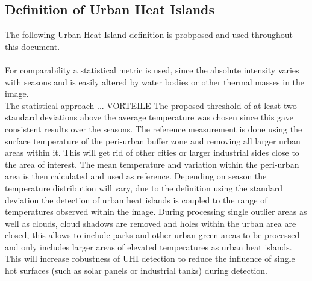 \documentclass[12pt,a4paper, english,twoside]{article}
\begin{document}
    \subsection{Definition of Urban Heat Islands}\label{sec:definition}
    The following Urban Heat Island definition is probposed and used throughout this document.\\
    \\
    \noindent{}\vspace{2cm}
% 
    For comparability a statistical metric is used, since the absolute intensity varies with seasons %
    and is easily altered by water bodies or other thermal masses in the image.\\ 
    The statistical approach ... VORTEILE %
    The proposed threshold of at least two standard deviations above the average temperature was chosen since this gave consistent results over the seasons. %
    The reference measurement is done using the surface temperature of the peri-urban buffer zone and removing all larger urban areas within it. 
    This will get rid of other cities or larger industrial sides close to the area of interest.
    The mean temperature and variation within the peri-urban area is then calculated and used as reference.
    Depending on season the temperature distribution will vary, due to the definition using the standard deviation the detection of urban heat islands is coupled to the range of temperatures observed within the image. 
    During processing single outlier areas as well as clouds, cloud shadows are removed and holes within the urban area are closed, this allows to include parks and other urban green areas to be processed and only includes larger areas of elevated temperatures as urban heat islands. 
    This will increase robustness of \gls{UHI} detection to reduce the influence of single hot surfaces (such as solar panels or industrial tanks) during detection.
\end{document}
